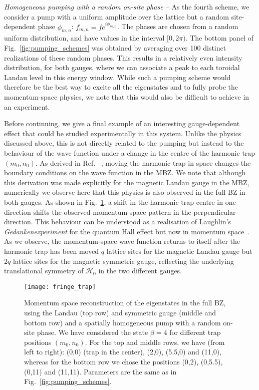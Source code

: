 {\em{Homogeneous pumping with a random on-site phase --}} As the fourth scheme, we consider a pump with a uniform amplitude over the lattice but a random site-dependent phase $\phi_{m,n}$:
$f_{m,n}=fe^{i\phi_{m,n}}$. The phases are chosen from a random
uniform distribution, and have values in the interval $[0,2\pi)$. The
bottom panel of Fig.~\ref{fig:pumping_schemes} was obtained by
averaging over 100 distinct realizations of these random phases. This
results in a relatively even intensity distribution, for both gauges, where we can associate a peak to each toroidal Landau level in this energy window. While such a pumping scheme would therefore be the best way to excite all the eigenstates and to fully probe the momentum-space physics, we note that this would also be difficult to achieve in an experiment.

Before continuing, we give a final example of an interesting gauge-dependent effect that could be studied experimentally in this system. Unlike the physics discussed above, this is not directly related to the pumping but instead to the behaviour of the wave function under a change in the centre of the harmonic trap $(m_0, n_0)$. As derived in Ref. ~\cite{ozawa2014momhh}, moving the
harmonic trap in space changes the boundary conditions on the wave function in the MBZ. We note that although this derivation was made explicitly for the magnetic Landau gauge in the MBZ, numerically we observe here that this physics is also observed in the full BZ in both gauges. 
As shown in Fig.~\ref{fig:moving_trap}, a shift in the harmonic trap centre in one direction shifts the observed momentum-space pattern in the perpendicular direction. This behaviour can be understood as a realisation of Laughlin's {\em Gedankenexperiment} for the quantum Hall effect but now in momentum space~\cite{ozawa2014momhh}. As we observe, the momentum-space wave function returns to itself after the harmonic trap has been moved $q$ lattice sites for the magnetic Landau gauge but $2q$ lattice sites for the magnetic symmetric gauge, reflecting the underlying translational symmetry of $\mathcal{H}_0$ in the two different gauges. 


\begin{figure}[htb]
  \centering
  \texttt{[image: fringe\_trap]} %
  \caption{Momentum space reconstruction of the eigenstates in the
    full BZ, using the Landau (top row) and symmetric gauge (middle
    and bottom row) and a spatially homogeneous pump with
    a random on-site phase. We have considered the state $\beta = 4$ for
    different trap positions $(m_0, n_0)$. For the top and middle
    rows, we have (from left to right): (0,0) (trap in the center),
    (2,0), (5.5,0) and (11,0), whereas for the bottom row we chose the
    positions (0,2), (0,5.5), (0,11) and (11,11). Parameters are the same as in Fig.~\ref{fig:pumping_schemes}.}
  \label{fig:moving_trap}
\end{figure}

